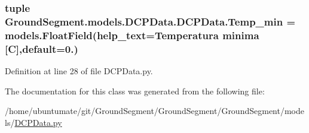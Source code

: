 \subsubsection[{Temp\+\_\+min}]{\setlength{\rightskip}{0pt plus 5cm}tuple Ground\+Segment.\+models.\+D\+C\+P\+Data.\+D\+C\+P\+Data.\+Temp\+\_\+min = models.\+Float\+Field(help\+\_\+text=\textquotesingle{}Temperatura minima \mbox{[}C\mbox{]}\textquotesingle{},default=0.)\hspace{0.3cm}{\ttfamily [static]}}\label{class_ground_segment_1_1models_1_1_d_c_p_data_1_1_d_c_p_data_afb341524b4476336e7ccc85e01acbee1}


Definition at line 28 of file D\+C\+P\+Data.\+py.



The documentation for this class was generated from the following file\+:\begin{DoxyCompactItemize}
\item 
/home/ubuntumate/git/\+Ground\+Segment/\+Ground\+Segment/\+Ground\+Segment/models/\hyperlink{_d_c_p_data_8py}{D\+C\+P\+Data.\+py}\end{DoxyCompactItemize}

